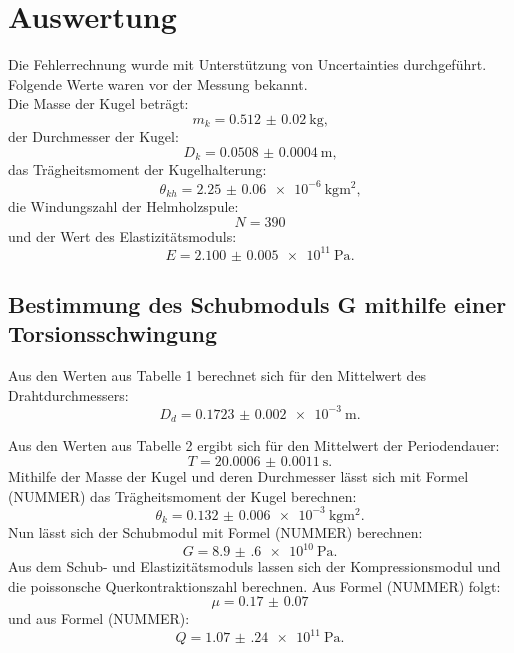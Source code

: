 
\section{Auswertung}
\label{sec:Auswertung}
Die Fehlerrechnung wurde mit Unterstützung von Uncertainties \cite{uncertainties} durchgeführt.
Folgende Werte waren vor der Messung bekannt.\\
Die Masse der Kugel beträgt:
\begin{equation}
	m_k = \SI{0.512(20)}{\kilogram}\text{,}
\end{equation}
der Durchmesser der Kugel:
\begin{equation}
	D_{k} = \SI{0.0508(4)}{\meter}\text{,}
\end{equation}
das Trägheitsmoment der Kugelhalterung:  
\begin{equation}
	\theta_{kh} = \SI{2.25(6)e-6}{\kilogram\meter\squared}\text{,}
\end{equation}
die Windungszahl der Helmholzspule:
\begin{equation}
	N = \num{390}
\end{equation}
und der Wert des Elastizitätsmoduls:  
\begin{equation}
	E = \SI{2.100(5)e11}{\pascal}\text{.}
\end{equation}




\subsection{Bestimmung des Schubmoduls G mithilfe einer Torsionsschwingung}

Aus den Werten aus Tabelle 1 berechnet sich für den Mittelwert des Drahtdurchmessers:
\begin{equation}
	D_d = \SI{0.1723(20)e-3}{\meter}\text{.}
\end{equation}

Aus den Werten aus Tabelle 2 ergibt sich für den Mittelwert der Periodendauer:
\begin{equation}
	T = \SI{20.0006(11)}{\second}\text{.}
\end{equation}
Mithilfe der Masse der Kugel und deren Durchmesser lässt sich mit Formel (NUMMER) das Trägheitsmoment der Kugel berechnen:
\begin{equation}
	\theta_{k} = \SI{0.132(6)e-3}{\kilogram\meter\squared}\text{.}
\end{equation}
Nun lässt sich der Schubmodul mit Formel (NUMMER) berechnen:
\begin{equation}
	G = \SI{8.9(6)e10}{\pascal}\text{.}
\end{equation}
Aus dem Schub- und Elastizitätsmoduls lassen sich der Kompressionsmodul und die poissonsche Querkontraktionszahl berechnen. Aus Formel (NUMMER) folgt:
\begin{equation}
	\mu = \num{0.17(7)}
\end{equation}
und aus Formel (NUMMER):
\begin{equation}
	Q = \SI{1.07(24)e11}{\pascal}\text{.}
\end{equation}

